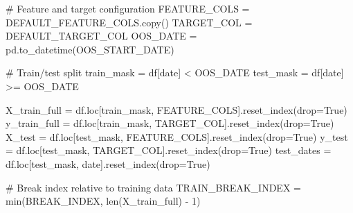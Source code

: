 \documentclass[
  letterpaper,
  DIV=11,
  numbers=noendperiod]{scrartcl}
\newenvironment{Shaded}{\begin{snugshade}}{\end{snugshade}}
\newcommand{\BuiltInTok}[1]{\textcolor[rgb]{0.00,0.23,0.31}{#1}}
\newcommand{\CommentTok}[1]{\textcolor[rgb]{0.37,0.37,0.37}{#1}}
\newcommand{\DecValTok}[1]{\textcolor[rgb]{0.68,0.00,0.00}{#1}}
\newcommand{\NormalTok}[1]{\textcolor[rgb]{0.00,0.23,0.31}{#1}}
\newcommand{\OperatorTok}[1]{\textcolor[rgb]{0.37,0.37,0.37}{#1}}
\newcommand{\StringTok}[1]{\textcolor[rgb]{0.13,0.47,0.30}{#1}}
\newcommand{\VariableTok}[1]{\textcolor[rgb]{0.07,0.07,0.07}{#1}}
\begin{document}
\begin{Shaded}
\begin{Highlighting}[]
\CommentTok{\# Feature and target configuration}
\NormalTok{FEATURE\_COLS }\OperatorTok{=}\NormalTok{ DEFAULT\_FEATURE\_COLS.copy()}
\NormalTok{TARGET\_COL }\OperatorTok{=}\NormalTok{ DEFAULT\_TARGET\_COL}
\NormalTok{OOS\_DATE }\OperatorTok{=}\NormalTok{ pd.to\_datetime(OOS\_START\_DATE)}

\CommentTok{\# Train/test split}
\NormalTok{train\_mask }\OperatorTok{=}\NormalTok{ df[}\StringTok{\textquotesingle{}date\textquotesingle{}}\NormalTok{] }\OperatorTok{\textless{}}\NormalTok{ OOS\_DATE}
\NormalTok{test\_mask }\OperatorTok{=}\NormalTok{ df[}\StringTok{\textquotesingle{}date\textquotesingle{}}\NormalTok{] }\OperatorTok{\textgreater{}=}\NormalTok{ OOS\_DATE}

\NormalTok{X\_train\_full }\OperatorTok{=}\NormalTok{ df.loc[train\_mask, FEATURE\_COLS].reset\_index(drop}\OperatorTok{=}\VariableTok{True}\NormalTok{)}
\NormalTok{y\_train\_full }\OperatorTok{=}\NormalTok{ df.loc[train\_mask, TARGET\_COL].reset\_index(drop}\OperatorTok{=}\VariableTok{True}\NormalTok{)}
\NormalTok{X\_test }\OperatorTok{=}\NormalTok{ df.loc[test\_mask, FEATURE\_COLS].reset\_index(drop}\OperatorTok{=}\VariableTok{True}\NormalTok{)}
\NormalTok{y\_test }\OperatorTok{=}\NormalTok{ df.loc[test\_mask, TARGET\_COL].reset\_index(drop}\OperatorTok{=}\VariableTok{True}\NormalTok{)}
\NormalTok{test\_dates }\OperatorTok{=}\NormalTok{ df.loc[test\_mask, }\StringTok{\textquotesingle{}date\textquotesingle{}}\NormalTok{].reset\_index(drop}\OperatorTok{=}\VariableTok{True}\NormalTok{)}

\CommentTok{\# Break index relative to training data}
\NormalTok{TRAIN\_BREAK\_INDEX }\OperatorTok{=} \BuiltInTok{min}\NormalTok{(BREAK\_INDEX, }\BuiltInTok{len}\NormalTok{(X\_train\_full) }\OperatorTok{{-}} \DecValTok{1}\NormalTok{)}


\end{Highlighting}
\end{Shaded}
\end{document}
